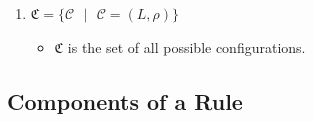\documentclass{article}
\newcommand{\s}{\text{ }}
\begin{document}
\begin{appendices}
\begin{enumerate}
\item $\mathfrak{C} = \{\mathcal{C} \s | \s \mathcal{C} = (L, \rho)\}$
      \begin{itemize}
      \item $\mathfrak{C}$ is the set of all possible configurations.
      \end{itemize}

\end{enumerate}


\subsection{Components of a Rule} \label{a-ff2-rule}


\end{appendices}
\end{document}
